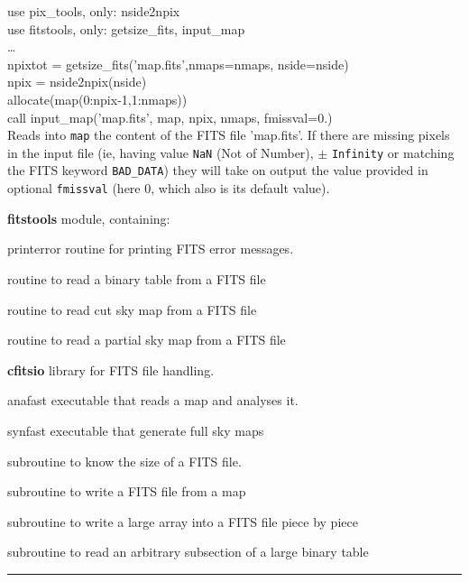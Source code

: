 \begin{example}
{
use pix\_tools, only: nside2npix \\
use fitstools, only: getsize\_fits, input\_map \\
\ldots \\
npixtot = getsize\_fits('map.fits',nmaps=nmaps, nside=nside) \\
npix = nside2npix(nside) \\
allocate(map(0:npix-1,1:nmaps)) \\
call input\_map('map.fits', map, npix, nmaps, fmissval=0.)  \\
}
{
Reads into {\tt map} the content of the FITS file 'map.fits'.
If there are
missing pixels in the input file (ie, having value {\tt NaN} (Not of Number),
$\pm$ {\tt Infinity} or matching the FITS keyword {\tt BAD\_DATA}) they will
take on output the value provided in optional {\tt fmissval} (here 0, which also
is its default value).
}
\end{example}
\begin{modules}
  \begin{sulist}{} %
  \item[\textbf{fitstools}] module, containing:
  \item[printerror] routine for printing FITS error messages.
  \item[\htmlref{read\_bintab}{sub:read_bintab}] routine to read a binary table
  from a FITS file
  \item[\htmlref{read\_fits\_cut4}{sub:read_fits_cut4}] routine to read cut sky
  map from a FITS file
  \item[\htmlref{read\_fits\_partial}{sub:read_fits_partial}] routine to read a partial sky
  map from a FITS file
  \item[\textbf{cfitsio}] library for FITS file handling.
  \end{sulist}
\end{modules}

\begin{related}
  \begin{sulist}{} %
  \item[anafast] executable that reads a \healpix map and analyses it. 
  \item[synfast] executable that generate full sky \healpix maps
  \item[\htmlref{getsize\_fits}{sub:getsize_fits}] subroutine to know the size of a FITS file.
  \item[\htmlref{output\_map}{sub:output_map}] subroutine to write a FITS file
  from a \healpix map
  \item[\htmlref{write\_bintabh}{sub:write_bintabh}] subroutine to write a large
  array into a FITS file piece by piece
  \item[\htmlref{input\_tod*}{sub:input_tod}] subroutine to read an arbitrary subsection of
  a large binary table
  \end{sulist}
\end{related}

\rule{\hsize}{2mm}

\newpage
